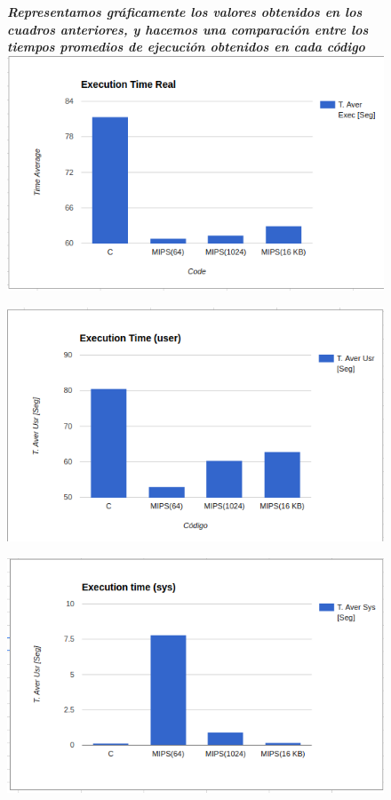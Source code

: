 \documentclass{article}
\begin{document}
\begin{figure}[H]
\textit{\textbf{Representamos gráficamente los valores obtenidos en los cuadros anteriores, y hacemos una comparación entre los tiempos promedios de ejecución obtenidos en cada código}}\\
	\centering
		\includegraphics[scale=0.6]{TPromExecReal.png}
\end{figure}
\begin{figure}[H]
	\centering
	\includegraphics[scale=0.6]{TPromExecUsr.png}
\end{figure}
\begin{figure}[H]
	\centering
		\includegraphics[scale=0.6]{TPromExecSys.png}
\end{figure}
\end{document}
